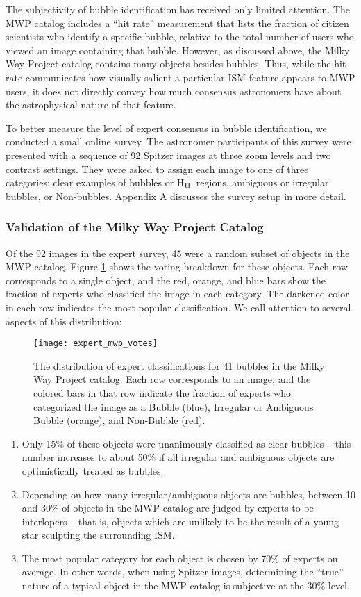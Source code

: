 \documentclass[preprint]{aastex}
\newcommand{\hii}[0]{H$_{\rm II}$}
\begin{document}
The subjectivity of bubble identification has received only limited attention. The MWP catalog includes a ``hit rate'' measurement that lists the fraction of citizen scientists who identify a specific bubble, relative to the total number of users who viewed an image containing that bubble. However, as discussed above, the Milky Way Project catalog contains many objects besides bubbles. Thus, while the hit rate communicates how visually salient a particular ISM feature appears to MWP users, it does not directly convey how much consensus astronomers have about the astrophysical nature of that feature.

To better measure the level of expert consensus in bubble identification, we conducted a small online survey. The astronomer participants of this survey were presented with a sequence of 92 Spitzer images at three zoom levels and two contrast settings. They were asked to assign each image to one of three categories: clear examples of bubbles or \hii\, regions, ambiguous or irregular bubbles, or Non-bubbles. Appendix A discusses the survey setup in more detail.

\subsubsection{Validation of the Milky Way Project Catalog}
\label{sec:expert_mwp}
Of the 92 images in the expert survey, 45 were a random subset of objects in the MWP catalog. Figure \ref{fig:expert_mwp_votes} shows the voting breakdown for these objects. Each row corresponds to a single object, and the red, orange, and blue bars show the fraction of experts who classified the image in each category. The darkened color in each row indicates the most popular classification.  We call attention to several aspects of this distribution: 


\begin{figure}[h!]
\texttt{[image: expert\_mwp\_votes]}
\caption{The distribution of expert classifications for 41 bubbles in the Milky Way Project catalog. Each row corresponds to an image, and the colored bars in that row indicate the fraction of experts who categorized the image as a Bubble (blue), Irregular or Ambiguous Bubble (orange), and Non-Bubble (red).}
\label{fig:expert_mwp_votes}
\end{figure}

\begin{enumerate} 
\item Only 15\% of these objects were unanimously classified as clear bubbles -- this number increases to about 50\% if all irregular and ambiguous objects are optimistically treated as bubbles. 
\item Depending on how many irregular/ambiguous objects are bubbles, between 10 and 30\% of objects in the MWP catalog are judged by experts to be interlopers -- that is, objects which are unlikely to be the result of a young star sculpting the surrounding ISM.
\item The most popular category for each object is chosen by 70\% of experts on average. In other words, when using Spitzer images, determining the ``true'' nature of a typical object in the MWP catalog is subjective at the 30\% level.
\end{enumerate}
\end{document}
